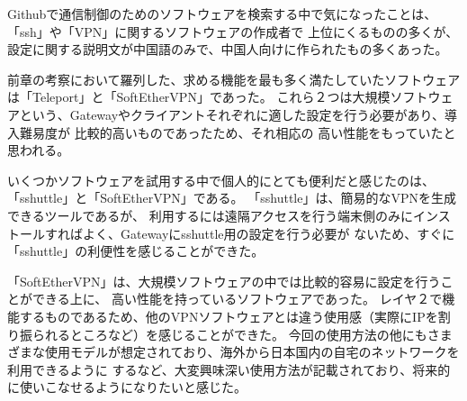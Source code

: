 \documentclass[11pt,a4j,titlepage]{jreport}
\begin{document}
Githubで通信制御のためのソフトウェアを検索する中で気になったことは、「ssh」や「VPN」に関するソフトウェアの作成者で
上位にくるものの多くが、設定に関する説明文が中国語のみで、中国人向けに作られたもの多くあった。

\fi

前章の考察において羅列した、求める機能を最も多く満たしていたソフトウェアは「Teleport」と「SoftEtherVPN」であった。
これら２つは大規模ソフトウェアという、Gatewayやクライアントそれぞれに適した設定を行う必要があり、導入難易度が
比較的高いものであったため、それ相応の
高い性能をもっていたと思われる。\par
いくつかソフトウェアを試用する中で個人的にとても便利だと感じたのは、「sshuttle」と「SoftEtherVPN」である。
「sshuttle」は、簡易的なVPNを生成できるツールであるが、
利用するには遠隔アクセスを行う端末側のみにインストールすればよく、Gatewayにsshuttle用の設定を行う必要が
ないため、すぐに「sshuttle」の利便性を感じることができた。\par
「SoftEtherVPN」は、大規模ソフトウェアの中では比較的容易に設定を行うことができる上に、
高い性能を持っているソフトウェアであった。
レイヤ２で機能するものであるため、他のVPNソフトウェアとは違う使用感（実際にIPを割り振られるところなど）を感じることができた。
今回の使用方法の他にもさまざまな使用モデルが想定されており、海外から日本国内の自宅のネットワークを利用できるように
するなど、大変興味深い使用方法が記載されており、将来的に使いこなせるようになりたいと感じた。


















\end{document}
